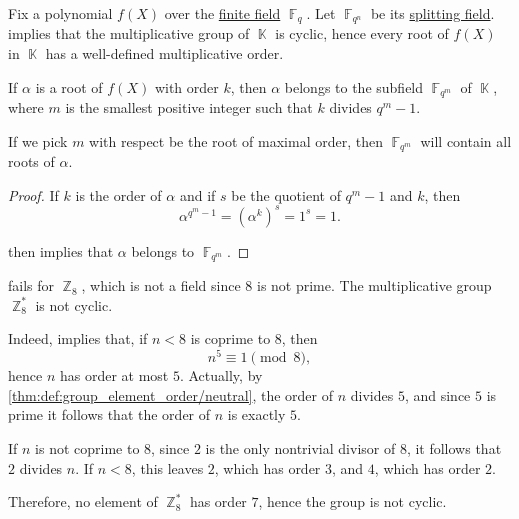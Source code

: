 \begin{corollary}\label{thm:finite_splitting_field}
  Fix a polynomial \( f(X) \) over the \hyperref[def:finite_field]{finite field} \( \BbbF_q \). Let \( \BbbF_{q^n} \) be its \hyperref[def:splitting_field]{splitting field}.  implies that the multiplicative group of \( \BbbK \) is cyclic, hence every root of \( f(X) \) in \( \BbbK \) has a well-defined multiplicative order.

  If \( \alpha \) is a root of \( f(X) \) with order \( k \), then \( \alpha \) belongs to the subfield \( \BbbF_{q^m} \) of \( \BbbK \), where \( m \) is the smallest positive integer such that \( k \) divides \( q^m - 1 \).
\end{corollary}
\begin{comments}
  \item If we pick \( m \) with respect be the root of maximal order, then \( \BbbF_{q^m} \) will contain all roots of \( \alpha \).
\end{comments}
\begin{proof}
  If \( k \) is the order of \( \alpha \) and if \( s \) be the quotient of \( q^m - 1 \) and \( k \), then
  \begin{equation*}
    \alpha^{q^m - 1} = (\alpha^k)^s = 1^s = 1.
  \end{equation*}

   then implies that \( \alpha \) belongs to \( \BbbF_{q^m} \).
\end{proof}

\begin{example}\label{thm:multiplicative_group_of_z8}
   fails for \( \BbbZ_8 \), which is not a field since \( 8 \) is not prime. The multiplicative group \( \BbbZ_8^* \) is not cyclic.

  Indeed,  implies that, if \( n < 8 \) is coprime to \( 8 \), then
  \begin{equation*}
    n^5 \equiv 1 \pmod 8,
  \end{equation*}
  hence \( n \) has order at most \( 5 \). Actually, by \cref{thm:def:group_element_order/neutral}, the order of \( n \) divides \( 5 \), and since \( 5 \) is prime it follows that the order of \( n \) is exactly \( 5 \).

  If \( n \) is not coprime to \( 8 \), since \( 2 \) is the only nontrivial divisor of \( 8 \), it follows that \( 2 \) divides \( n \). If \( n < 8 \), this leaves \( 2 \), which has order \( 3 \), and \( 4 \), which has order \( 2 \).

  Therefore, no element of \( \BbbZ_8^* \) has order \( 7 \), hence the group is not cyclic.
\end{example}


